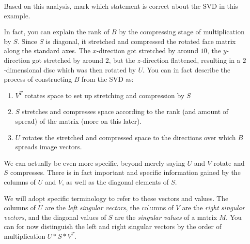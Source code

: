 \documentclass{ximera}
\begin{document}
\begin{problem}

Based on this analysis, mark which statement is correct about the SVD in this example.

\begin{multipleChoice}


\end{multipleChoice}

\begin{feedback}

  In fact, you can explain the rank of $B$ by the compressing stage of multiplication by $S$. Since $S$ is diagonal, it stretched and compressed the rotated face matrix along the standard axes. The $x$-direction got stretched by around $10$, the $y$-direction got stretched by around $2$, but the $z$-direction flattened, resulting in a $2$-dimensional disc which was then rotated by $U$. You can in fact describe the process of constructing $B$ from the SVD as: 

  \begin{enumerate}
    \item $V^T$ rotates space to set up stretching and compression by $S$
    \item $S$ stretches and compresses space according to the rank (and amount of spread) of the matrix (more on this later).
    \item $U$ rotates the stretched and compressed space to the directions over which $B$ spreads image vectors.
  \end{enumerate}

\end{feedback}

\end{problem}

We can actually be even more specific, beyond merely saying $U$ and $V$ rotate and $S$ compresses. There is in fact important and specific information gained by the columns of $U$ and $V$, as well as the diagonal elements of $S$. 

We will adopt specific terminology to refer to these vectors and values. The columns of $U$ are the \emph{left singular vectors}, the columns of $V$ are the \emph{right singular vectors}, and the diagonal values of $S$ are the \emph{singular values} of a matrix $M$. You can for now distinguish the left and right singular vectors by the order of multiplication $U*S*V^T$.
\end{document}
